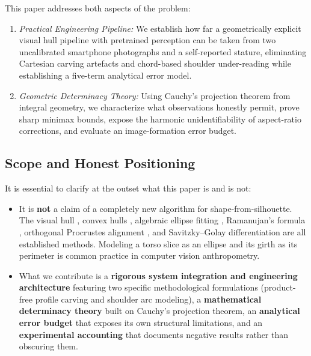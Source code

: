 \documentclass[journal]{IEEEtran}
\begin{document}
This paper addresses both aspects of the problem:
\begin{enumerate}
    \item \textit{Practical Engineering Pipeline:} We establish how far a geometrically explicit visual hull pipeline with pretrained perception can be taken from two uncalibrated smartphone photographs and a self-reported stature, eliminating Cartesian carving artefacts and chord-based shoulder under-reading while establishing a five-term analytical error model.
    \item \textit{Geometric Determinacy Theory:} Using Cauchy's projection theorem from integral geometry, we characterize what observations honestly permit, prove sharp minimax bounds, expose the harmonic unidentifiability of aspect-ratio corrections, and evaluate an image-formation error budget.
\end{enumerate}

\subsection{Scope and Honest Positioning}
It is essential to clarify at the outset what this paper is and is not:
\begin{itemize}
    \item It is \textbf{not} a claim of a completely new algorithm for shape-from-silhouette. The visual hull \cite{laurentini1994visual}, convex hulls \cite{graham1972efficient}, algebraic ellipse fitting \cite{fitzgibbon1999direct}, Ramanujan's formula \cite{ramanujan1914modular}, orthogonal Procrustes alignment \cite{schonemann1966generalized}, and Savitzky--Golay differentiation \cite{savitzky1964smoothing} are all established methods. Modeling a torso slice as an ellipse and its girth as its perimeter is common practice in computer vision anthropometry.
    \item What we contribute is a \textbf{rigorous system integration and engineering architecture} featuring two specific methodological formulations (product-free profile carving and shoulder arc modeling), a \textbf{mathematical determinacy theory} built on Cauchy's projection theorem, an \textbf{analytical error budget} that exposes its own structural limitations, and an \textbf{experimental accounting} that documents negative results rather than obscuring them.
\end{itemize}
\end{document}
